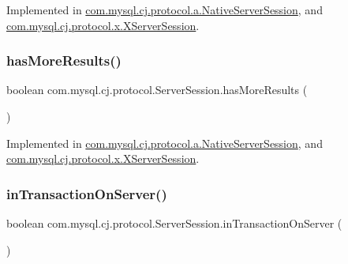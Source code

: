 Implemented in \mbox{\hyperlink{classcom_1_1mysql_1_1cj_1_1protocol_1_1a_1_1_native_server_session_ac5dca7c3f6c90dc330ed8fb7f7c74069}{com.\+mysql.\+cj.\+protocol.\+a.\+Native\+Server\+Session}}, and \mbox{\hyperlink{classcom_1_1mysql_1_1cj_1_1protocol_1_1x_1_1_x_server_session_af4f50b365f485abca8051b96a1cdd486}{com.\+mysql.\+cj.\+protocol.\+x.\+X\+Server\+Session}}.

\mbox{\label{interfacecom_1_1mysql_1_1cj_1_1protocol_1_1_server_session_a8bdf17d831029c823ce4277ffe3c3fd3}} 
\subsubsection{\texorpdfstring{has\+More\+Results()}{hasMoreResults()}}
{\footnotesize\ttfamily boolean com.\+mysql.\+cj.\+protocol.\+Server\+Session.\+has\+More\+Results (\begin{DoxyParamCaption}{ }\end{DoxyParamCaption})}



Implemented in \mbox{\hyperlink{classcom_1_1mysql_1_1cj_1_1protocol_1_1a_1_1_native_server_session_ac688e04f00ac979c7e9430c998d12ae0}{com.\+mysql.\+cj.\+protocol.\+a.\+Native\+Server\+Session}}, and \mbox{\hyperlink{classcom_1_1mysql_1_1cj_1_1protocol_1_1x_1_1_x_server_session_a2bfff32e31d81971161b232dd2288228}{com.\+mysql.\+cj.\+protocol.\+x.\+X\+Server\+Session}}.

\mbox{\label{interfacecom_1_1mysql_1_1cj_1_1protocol_1_1_server_session_a90f38b18d831d00e5074f12a0a88fad7}} 
\subsubsection{\texorpdfstring{in\+Transaction\+On\+Server()}{inTransactionOnServer()}}
{\footnotesize\ttfamily boolean com.\+mysql.\+cj.\+protocol.\+Server\+Session.\+in\+Transaction\+On\+Server (\begin{DoxyParamCaption}{ }\end{DoxyParamCaption})}



